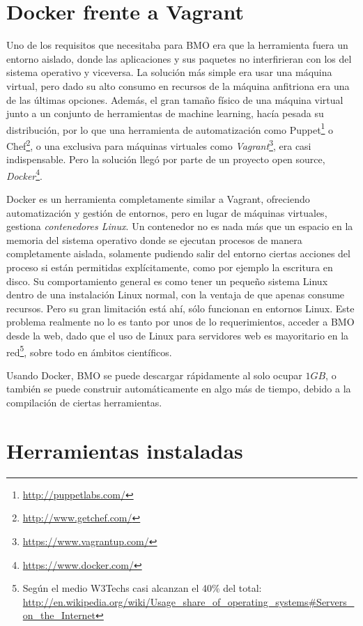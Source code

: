 \section{Docker frente a Vagrant} \label{sec:4.3}

Uno de los requisitos que necesitaba para BMO era que la herramienta fuera un entorno aislado, donde las aplicaciones y sus paquetes no interfirieran con los del sistema operativo y viceversa. La solución más simple era usar una máquina virtual, pero dado su alto consumo en recursos de la máquina anfitriona era una de las últimas opciones. Además, el gran tamaño físico de una máquina virtual junto a un conjunto de herramientas de machine learning, hacía pesada su distribución, por lo que una herramienta de automatización como Puppet\footnote{\url{http://puppetlabs.com/}} o Chef\footnote{\url{http://www.getchef.com/}}, o una exclusiva para máquinas virtuales como \emph{Vagrant}\footnote{\url{https://www.vagrantup.com/}}, era casi indispensable. Pero la solución llegó por parte de un proyecto open source, \emph{Docker}\footnote{\url{https://www.docker.com/}}.

Docker es un herramienta completamente similar a Vagrant, ofreciendo automatización y gestión de entornos, pero en lugar de máquinas virtuales, gestiona \emph{contenedores Linux}. Un contenedor no es nada más que un espacio en la memoria del sistema operativo donde se ejecutan procesos de manera completamente aislada, solamente pudiendo salir del entorno ciertas acciones del proceso si están permitidas explícitamente, como por ejemplo la escritura en disco. Su comportamiento general es como tener un pequeño sistema Linux dentro de una instalación Linux normal, con la ventaja de que apenas consume recursos. Pero su gran limitación está ahí, sólo funcionan en entornos Linux. Este problema realmente no lo es tanto por unos de lo requerimientos, acceder a BMO desde la web, dado que el uso de Linux para servidores web es mayoritario en la red\footnote{Según el medio W3Techs casi alcanzan el 40\% del total: \url{http://en.wikipedia.org/wiki/Usage_share_of_operating_systems\#Servers_on_the_Internet}}, sobre todo en ámbitos científicos.

Usando Docker, BMO se puede descargar rápidamente al solo ocupar $1GB$, o también se puede construir automáticamente en algo más de tiempo, debido a la compilación de ciertas herramientas.

\section{Herramientas instaladas} \label{sec:4.4}

